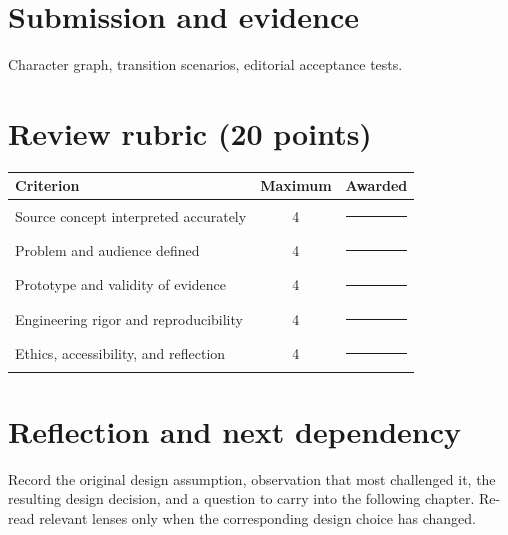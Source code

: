\documentclass[11pt]{article}
\begin{document}
\section{Submission and evidence}
Character graph, transition scenarios, editorial acceptance tests.


\section{Review rubric (20 points)}
\begin{tabularx}{\linewidth}{@{}Xcc@{}}\toprule
Criterion & Maximum & Awarded \\ \midrule
Source concept interpreted accurately & 4 & \rule{0.45in}{0.4pt}\\
Problem and audience defined & 4 & \rule{0.45in}{0.4pt}\\
Prototype and validity of evidence & 4 & \rule{0.45in}{0.4pt}\\
Engineering rigor and reproducibility & 4 & \rule{0.45in}{0.4pt}\\
Ethics, accessibility, and reflection & 4 & \rule{0.45in}{0.4pt}\\\bottomrule
\end{tabularx}

\section{Reflection and next dependency}
Record the original design assumption, observation that most challenged it, the resulting design decision, and a question to carry into the following chapter. Re-read relevant lenses only when the corresponding design choice has changed.
\end{document}
